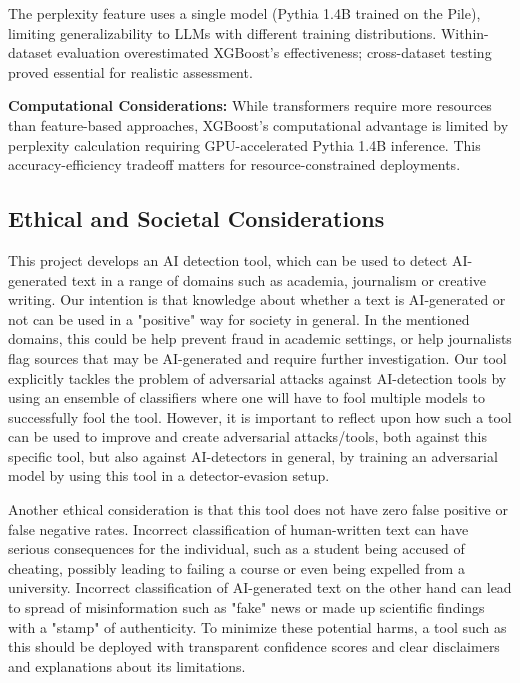 \documentclass[11pt]{article}
\begin{document}
The perplexity feature uses a single model (Pythia 1.4B trained on the Pile), limiting generalizability to LLMs with different training distributions. Within-dataset evaluation overestimated XGBoost's effectiveness; cross-dataset testing proved essential for realistic assessment.

\textbf{Computational Considerations:} While transformers require more resources than feature-based approaches, XGBoost's computational advantage is limited by perplexity calculation requiring GPU-accelerated Pythia 1.4B inference. This accuracy-efficiency tradeoff matters for resource-constrained deployments.

\subsection{Ethical and Societal Considerations}
\label{sec:ethical-considerations}
This project develops an AI detection tool, which can be used to detect AI-generated text in a range of domains such as academia, journalism or creative writing. Our intention is that knowledge about whether a text is AI-generated or not can be used in a "positive" way for society in general. In the mentioned domains, this could be help prevent fraud in academic settings, or help journalists flag sources that may be AI-generated and require further investigation. Our tool explicitly tackles the problem of adversarial attacks against AI-detection tools by using an ensemble of classifiers where one will have to fool multiple models to successfully fool the tool. However, it is important to reflect upon how such a tool can be used to improve and create adversarial attacks/tools, both against this specific tool, but also against AI-detectors in general, by training an adversarial model by using this tool in a detector-evasion setup.

Another ethical consideration is that this tool does not have zero false positive or false negative rates. Incorrect classification of human-written text can have serious consequences for the individual, such as a student being accused of cheating, possibly leading to failing a course or even being expelled from a university. Incorrect classification of AI-generated text on the other hand can lead to spread of misinformation such as "fake" news or made up scientific findings with a "stamp" of authenticity. To minimize these potential harms, a tool such as this should be deployed with transparent confidence scores and clear disclaimers and explanations about its limitations. 
\end{document}
